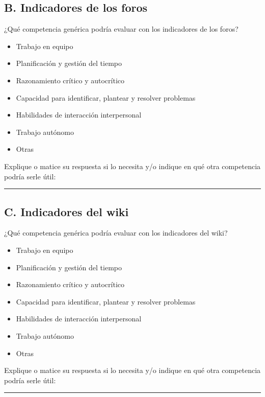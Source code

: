 \newpage

	\subsection*{B. Indicadores de los foros}

\begin{mdframed}[style=cuestionarioST]
		¿Qué competencia genérica podría evaluar con los indicadores de los foros?
			\begin{itemize}
				\item Trabajo en equipo
				\item Planificación y gestión del tiempo
				\item Razonamiento crítico y autocrítico
				\item Capacidad para identificar, plantear y resolver problemas
				\item Habilidades de interacción interpersonal
				\item Trabajo autónomo
				\item Otras
			\end{itemize}
		Explique o matice su respuesta si lo necesita y/o indique en qué otra competencia podría serle útil:\newline
			\rule{120mm}{1pt}
\end{mdframed}

	\subsection*{C. Indicadores del wiki}

\begin{mdframed}[style=cuestionarioST]
		¿Qué competencia genérica podría evaluar con los indicadores del wiki?
			\begin{itemize}
				\item Trabajo en equipo
				\item Planificación y gestión del tiempo
				\item Razonamiento crítico y autocrítico
				\item Capacidad para identificar, plantear y resolver problemas
				\item Habilidades de interacción interpersonal
				\item Trabajo autónomo
				\item Otras
			\end{itemize}
		Explique o matice su respuesta si lo necesita y/o indique en qué otra competencia podría serle útil:\newline
			\rule{120mm}{1pt}
\end{mdframed}

